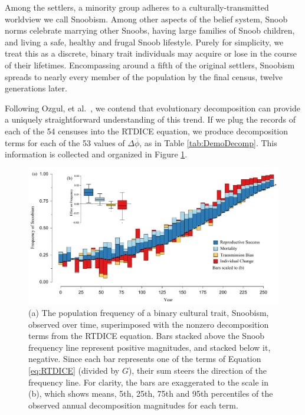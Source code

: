 Among the settlers, a minority group adheres to a culturally-transmitted worldview we call Snoobism.  Among other aspects of the belief system, Snoob norms celebrate marrying other Snoobs, having large families of Snoob children, and living a safe, healthy and frugal Snoob lifestyle.  Purely for simplicity, we treat this as a discrete, binary trait individuals may acquire or lose in the course of their lifetimes.  Encompassing around a fifth of the original settlers, Snoobism spreads to nearly every member of the population by the final census, twelve generations later.  

Following Ozgul, et al.~\citeyearpar{ozgul2009dynamics}, we contend that evolutionary decomposition can provide a uniquely straightforward understanding of this trend.  If we plug the records of each of the 54 censuses into the RTDICE equation, we produce decomposition terms for each of the 53 values of $\Delta \overline{\phi}$, as in Table \ref{tab:DemoDecomp}.  This information is collected and organized in Figure \ref{fig:Snoob}.

\begin{figure}[t]
\begin{center} 
\includegraphics[scale=0.5]{figures/rtdice/FigSnoobCol.pdf}
\caption{(a) The population frequency of a binary cultural trait, Snoobism, observed over time, superimposed with the nonzero decomposition terms from the RTDICE equation.  Bars stacked above the Snoob frequency line represent positive magnitudes, and stacked below it, negative.  Since each bar represents one of the terms of Equation \ref{eq:RTDICE} (divided by $G$), their sum steers the direction of the frequency line.  For clarity, the bars are exaggerated to the scale in (b), which shows means, 5th, 25th, 75th and 95th percentiles of the observed annual decomposition magnitudes for each term.}
\label{fig:Snoob}
\end{center}
\end{figure}

